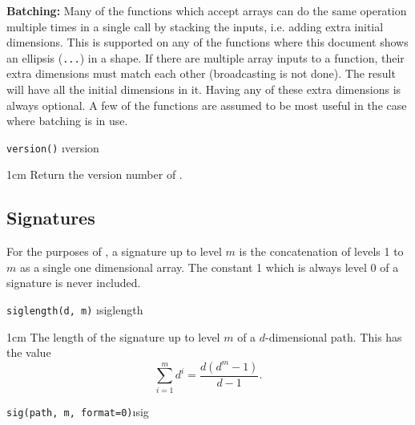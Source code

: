 \documentclass[a4paper]{extarticle}
\newenvironment{defn}{\begin{adjustwidth}{1cm}{}\ignorespaces}{\end{adjustwidth}\ignorespacesafterend}
\begin{document}
\textbf{Batching:} Many of the functions which accept arrays can do the same operation multiple times in a single call by stacking the inputs, i.e. adding extra initial dimensions. This is supported on any of the functions where this document shows an ellipsis (\verb|...|)  in a shape. If there are multiple array inputs to a function, their extra dimensions must match each other (broadcasting is not done).  The result will have all the initial dimensions in it. Having any of these extra dimensions is always optional. A few of the functions are assumed to be most useful in the case where batching is in use. %

\verb!version()! \i{version}

\begin{defn}
\nopagebreak Return the version number of \ii.
\end{defn}


\subsection{Signatures}
For the purposes of \ii, a signature up to level $m$ is the concatenation of levels 1 to $m$ as a single one dimensional array. The constant 1 which is always level 0 of a signature is never included. 

\verb!siglength(d, m)! \i{siglength}
\begin{defn}
\nopagebreak The length of the signature up to level $m$ of a $d$-dimensional path. This has the value
\[\sum_{i=1}^m d^i = \frac{d(d^m-1)}{d-1}.\]
\end{defn}

\verb!sig(path, m, format=0)!\i{sig}
\end{document}
